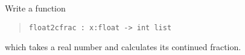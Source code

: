 Write a function
\begin{quote}
  \lstinline{float2cfrac : x:float -> int list}
\end{quote}
which takes a real number and calculates its continued fraction.
